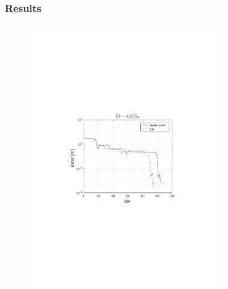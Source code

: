 \begin{frame}
    \frametitle{Results}

    \begin{columns}[t]
            \begin{figure}
                \centering
                \includegraphics[trim=4cm 9cm 4cm 8.5cm, clip=true, width=\linewidth]{img/convPlotS}
            \end{figure}
            \begin{figure}
                \centering

\end{figure}
\end{columns}
\end{frame}
